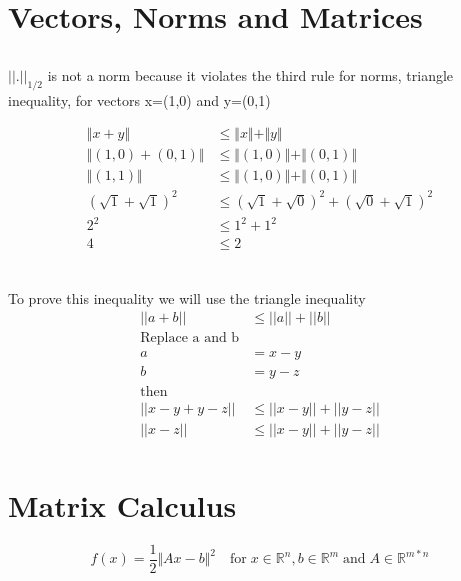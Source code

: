 \documentclass[12pt]{article}         %
\begin{document}
\section{Vectors, Norms and Matrices}


\subsection{}
$\vert$$\vert$.$\vert$$\vert_{1/2}$ is not a norm because it violates the third rule for norms, triangle inequality, for vectors x=(1,0) and y=(0,1)

$$
\begin{aligned}
\Vert x+y\Vert &\leq\Vert x\Vert  +\Vert y\Vert \\
\Vert (1, 0) + (0, 1)\Vert &\leq \Vert (1, 0)\Vert  + \Vert (0, 1)\Vert \\
\Vert (1, 1)\Vert &\leq \Vert (1, 0)\Vert  + \Vert (0, 1)\Vert \\
(\sqrt{1} + \sqrt{1})^2&\leq (\sqrt{1} + \sqrt{0})^2 + (\sqrt{0} + \sqrt{1})^2\\
2^2 &\leq 1^2 + 1^2\\
4 &\leq 2\\
\end{aligned}
$$

\subsection{}
To prove this inequality we will use the triangle inequality
$$
\begin{aligned}
||a + b||&\leq ||a|| + ||b||\\
\text{Replace a and b}\\ a &= x-y\\ b &= y-z\\ \text{then}\\
||x - y + y - z||&\leq ||x-y|| + ||y-z||\\
||x - z||&\leq ||x-y|| + ||y-z||\\
\end{aligned}
$$





\section{Matrix Calculus}

\begin{equation}
	f(x) = \dfrac{1}{2}\Vert Ax - b\Vert^2 \quad\text{for}\; x\in \mathbb{R} ^n ,b\in \mathbb{R}^m \;\text{and}\; A\in\mathbb{R}^{m*n}
\end{equation}
\end{document}
